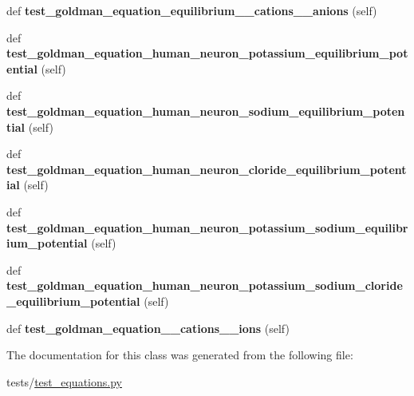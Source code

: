 \begin{DoxyCompactItemize}
def {\bfseries test\+\_\+goldman\+\_\+equation\+\_\+equilibrium\+\_\+\_\+cations\+\_\+\_\+anions} (self)
\item 
\mbox{\label{classtest__equations_1_1TestGoldmanEquation_a595e120edc107b8d638008c5e9b75dbe}} 
def {\bfseries test\+\_\+goldman\+\_\+equation\+\_\+human\+\_\+neuron\+\_\+potassium\+\_\+equilibrium\+\_\+potential} (self)
\item 
\mbox{\label{classtest__equations_1_1TestGoldmanEquation_af969126e3f846432cf1bc74b97695143}} 
def {\bfseries test\+\_\+goldman\+\_\+equation\+\_\+human\+\_\+neuron\+\_\+sodium\+\_\+equilibrium\+\_\+potential} (self)
\item 
\mbox{\label{classtest__equations_1_1TestGoldmanEquation_a26f411740e2ff6a2d067c225725c21b5}} 
def {\bfseries test\+\_\+goldman\+\_\+equation\+\_\+human\+\_\+neuron\+\_\+cloride\+\_\+equilibrium\+\_\+potential} (self)
\item 
\mbox{\label{classtest__equations_1_1TestGoldmanEquation_a33502b54a14e6a6cc2fed124b9f8feea}} 
def {\bfseries test\+\_\+goldman\+\_\+equation\+\_\+human\+\_\+neuron\+\_\+potassium\+\_\+sodium\+\_\+equilibrium\+\_\+potential} (self)
\item 
\mbox{\label{classtest__equations_1_1TestGoldmanEquation_ad274815885b016250dc154a48c757b6c}} 
def {\bfseries test\+\_\+goldman\+\_\+equation\+\_\+human\+\_\+neuron\+\_\+potassium\+\_\+sodium\+\_\+cloride\+\_\+equilibrium\+\_\+potential} (self)
\item 
\mbox{\label{classtest__equations_1_1TestGoldmanEquation_a5a2bd8eb7fde69944a349ba1a01374c5}} 
def {\bfseries test\+\_\+goldman\+\_\+equation\+\_\+\_\+cations\+\_\+\_\+ions} (self)
\end{DoxyCompactItemize}


The documentation for this class was generated from the following file\+:\begin{DoxyCompactItemize}
\item 
tests/\hyperlink{test__equations_8py}{test\+\_\+equations.\+py}\end{DoxyCompactItemize}
